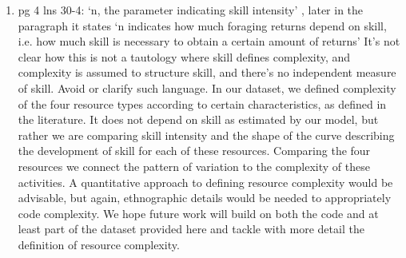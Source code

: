 \documentclass{article}
\newcommand{\rev}[1]{{\color{ForestGreen}#1}}
\begin{document}
\begin{enumerate}
    \item pg 4 lns 30-4: ‘n, the parameter indicating skill intensity’ , later in the paragraph it states ‘n indicates how much foraging returns depend on skill, i.e. how much skill is necessary to obtain a certain amount of returns’ It’s not clear how this is not a tautology where skill defines complexity, and complexity is assumed to structure skill, and there’s no independent measure of skill. Avoid or clarify such language.
    \rev{In our dataset, we defined complexity of the four resource types according to certain characteristics, as defined in the literature. It does not depend on skill as estimated by our model, but rather we are comparing skill intensity and the shape of the curve describing the development of skill for each of these resources. Comparing the four resources we connect the pattern of variation to the complexity of these activities. A quantitative approach to defining resource complexity would be advisable, but again, ethnographic details would be needed to appropriately code complexity. We hope future work will build on both the code and at least part of the dataset provided here and tackle with more detail the definition of resource complexity.    }
    

\end{enumerate}
\end{document}
